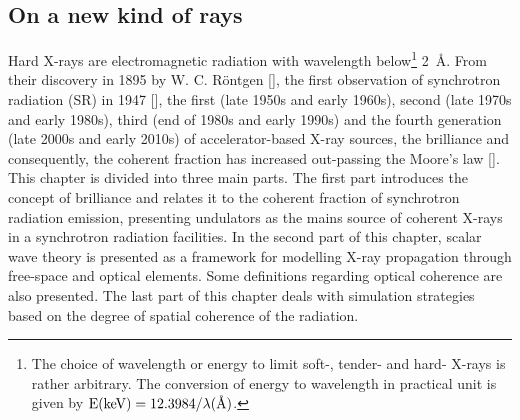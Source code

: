 
\begin{refsection}

\chapter{On a new kind of rays}\label{sec:x-rays}


Hard X-rays are electromagnetic radiation with wavelength below\footnote{The choice of wavelength or energy to limit soft-, tender- and hard- X-rays is rather arbitrary. The conversion of energy to wavelength in practical unit is given by $\text{E}(\text{keV})=12.3984/\lambda(\text{\r{A}})$.} 2~\r{A}. From their discovery in 1895 by W. C. R\"{o}ntgen [\cite{Roentgen1896}], the first observation of synchrotron radiation (SR) in 1947 [\cite{Elder1947}], the first (late 1950s and early 1960s), second (late 1970s and early 1980s), third (end of 1980s and early 1990s) and the fourth generation (late 2000s and early 2010s) of accelerator-based X-ray sources, the brilliance and consequently, the coherent fraction has increased out-passing the Moore's law [\cite{Robinson2015}]. This chapter is divided into three main parts. The first part introduces the concept of brilliance and relates it to the coherent fraction of synchrotron radiation emission, presenting undulators as the mains source of coherent X-rays in a synchrotron radiation facilities. In the second part of this chapter, scalar wave theory is presented as a framework for modelling X-ray propagation through free-space and optical elements. Some definitions regarding optical coherence are also presented. The last part of this chapter deals with simulation strategies based on the degree of spatial coherence of the radiation.

\end{refsection}
